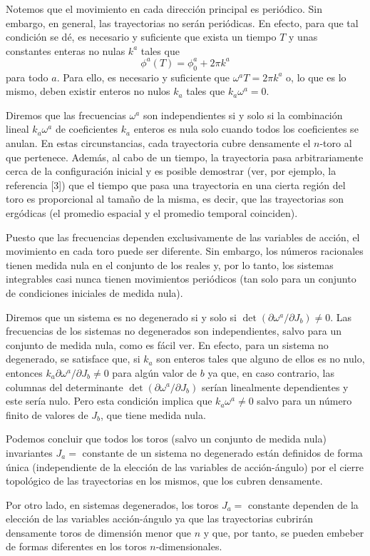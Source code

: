 Notemos que el movimiento en cada dirección principal es periódico. Sin embargo, en general, las trayectorias no serán periódicas. En efecto, para que tal condición se dé, es necesario y suficiente que exista un tiempo $T$ y unas constantes enteras no nulas $k^{a}$ tales que
$$
\phi^{a}(T)=\phi_{0}^{a}+2 \pi k^{a}
$$
para todo $a$. Para ello, es necesario y suficiente que $\omega^{a} T=2 \pi k^{a}$ o, lo que es lo mismo, deben existir enteros no nulos $k_{a}$ tales que $k_{a} \omega^{a}=0$.

Diremos que las frecuencias $\omega^{a}$ son independientes si y solo si la combinación lineal $k_{a} \omega^{a}$ de coeficientes $k_{a}$ enteros es nula solo cuando todos los coeficientes se anulan. En estas circunstancias, cada trayectoria cubre densamente el $n$-toro al que pertenece. Además, al cabo de un tiempo, la trayectoria pasa arbitrariamente cerca de la configuración inicial y es posible demostrar (ver, por ejemplo, la referencia [3]) que el tiempo que pasa una trayectoria en una cierta región del toro es proporcional al tamaño de la misma, es decir, que las trayectorias son ergódicas (el promedio espacial y el promedio temporal coinciden).

Puesto que las frecuencias dependen exclusivamente de las variables de acción, el movimiento en cada toro puede ser diferente. Sin embargo, los números racionales tienen medida nula en el conjunto de los reales y, por lo tanto, los sistemas integrables casi nunca tienen movimientos periódicos (tan solo para un conjunto de condiciones iniciales de medida nula).

Diremos que un sistema es no degenerado si y solo si $\operatorname{det}\left(\partial \omega^{a} / \partial J_{b}\right) \neq 0$. Las frecuencias de los sistemas no degenerados son independientes, salvo para un conjunto de medida nula, como es fácil ver. En efecto, para un sistema no degenerado, se satisface que, si $k_{a}$ son enteros tales que alguno de ellos es no nulo, entonces $k_{a} \partial \omega^{a} / \partial J_{b} \neq 0$ para algún valor de $b$ ya que, en caso contrario, las columnas del determinante $\operatorname{det}\left(\partial \omega^{a} / \partial J_{b}\right)$ serían linealmente dependientes y este sería nulo. Pero esta condición implica que $k_{a} \omega^{a} \neq 0$ salvo para un número finito de valores de $J_{b}$, que tiene medida nula.

Podemos concluir que todos los toros (salvo un conjunto de medida nula) invariantes $J_{a}=$ constante de un sistema no degenerado están definidos de forma única (independiente de la elección de las variables de acción-ángulo) por el cierre topológico de las trayectorias en los mismos, que los cubren densamente.

Por otro lado, en sistemas degenerados, los toros $J_{a}=$ constante dependen de la elección de las variables acción-ángulo ya que las trayectorias cubrirán densamente toros de dimensión menor que $n$ y que, por tanto, se pueden embeber de formas diferentes en los toros $n$-dimensionales.
